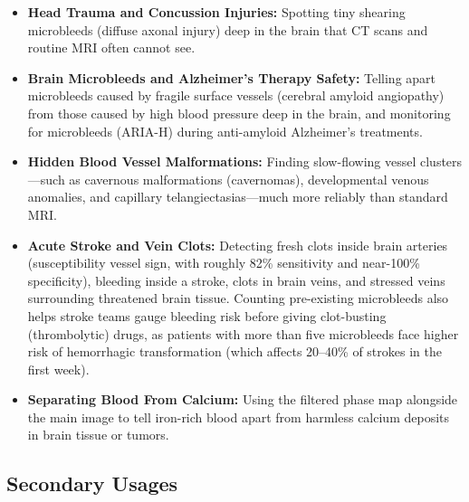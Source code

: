 \begin{itemize}
    \item \textbf{Head Trauma and Concussion Injuries:} Spotting tiny shearing microbleeds (diffuse axonal injury) deep in the brain that CT scans and routine MRI often cannot see.
    \item \textbf{Brain Microbleeds and Alzheimer's Therapy Safety:} Telling apart microbleeds caused by fragile surface vessels (cerebral amyloid angiopathy) from those caused by high blood pressure deep in the brain, and monitoring for microbleeds (ARIA-H) during anti-amyloid Alzheimer's treatments.
    \item \textbf{Hidden Blood Vessel Malformations:} Finding slow-flowing vessel clusters---such as cavernous malformations (cavernomas), developmental venous anomalies, and capillary telangiectasias---much more reliably than standard MRI.
    \item \textbf{Acute Stroke and Vein Clots:} Detecting fresh clots inside brain arteries (susceptibility vessel sign, with roughly 82\% sensitivity and near-100\% specificity), bleeding inside a stroke, clots in brain veins, and stressed veins surrounding threatened brain tissue. Counting pre-existing microbleeds also helps stroke teams gauge bleeding risk before giving clot-busting (thrombolytic) drugs, as patients with more than five microbleeds face higher risk of hemorrhagic transformation (which affects 20--40\% of strokes in the first week).
    \item \textbf{Separating Blood From Calcium:} Using the filtered phase map alongside the main image to tell iron-rich blood apart from harmless calcium deposits in brain tissue or tumors.
\end{itemize}

\subsection{Secondary Usages}

